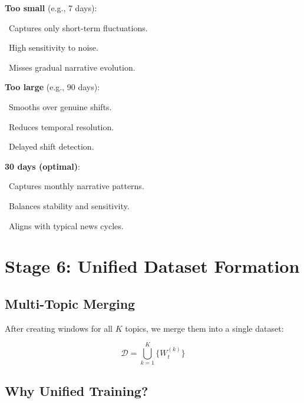 \documentclass[12pt]{article}
\begin{document}
\begin{tcolorbox}[colback=yellow!5!white, colframe=orange!75!black, title=Window Size Rationale]
\textbf{Too small} (e.g., 7 days):

\textbullet\ Captures only short-term fluctuations.

\textbullet\ High sensitivity to noise.

\textbullet\ Misses gradual narrative evolution.

\textbf{Too large} (e.g., 90 days):

\textbullet\ Smooths over genuine shifts.

\textbullet\ Reduces temporal resolution.

\textbullet\ Delayed shift detection.

\textbf{30 days (optimal)}:

\textbullet\ Captures monthly narrative patterns.

\textbullet\ Balances stability and sensitivity.

\textbullet\ Aligns with typical news cycles.
\end{tcolorbox}

\newpage

\section{Stage 6: Unified Dataset Formation}

\subsection{Multi-Topic Merging}

After creating windows for all $K$ topics, we merge them into a single dataset:

\begin{equation}
\mathcal{D} = \bigcup_{k=1}^{K} \{W_t^{(k)}\}
\end{equation}

\subsection{Why Unified Training?}
\end{document}

